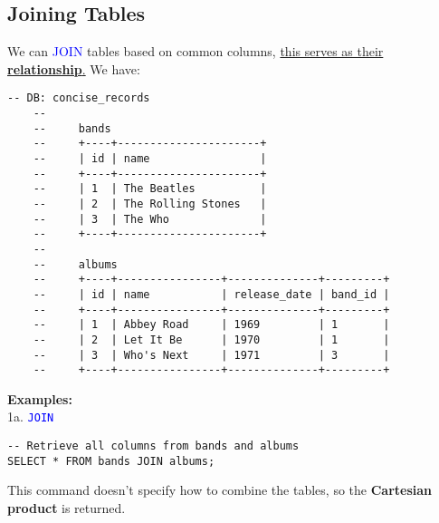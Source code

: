 \subsection{Joining Tables}
We can \textcolor{blue}{JOIN} tables based on common columns, \underline{this serves as their \textbf{relationship}.} We have:
\begin{lstlisting}[style=sql]
    -- DB: concise_records
    --
    --     bands
    --     +----+----------------------+
    --     | id | name                 |
    --     +----+----------------------+
    --     | 1  | The Beatles          |
    --     | 2  | The Rolling Stones   |
    --     | 3  | The Who              |
    --     +----+----------------------+
    --
    --     albums
    --     +----+----------------+--------------+---------+
    --     | id | name           | release_date | band_id |
    --     +----+----------------+--------------+---------+
    --     | 1  | Abbey Road     | 1969         | 1       |
    --     | 2  | Let It Be      | 1970         | 1       |
    --     | 3  | Who's Next     | 1971         | 3       |
    --     +----+----------------+--------------+---------+
\end{lstlisting}

\textbf{Examples:}\\
1a. \textcolor{blue}{\texttt{JOIN}}

\begin{lstlisting}[style=sql]
-- Retrieve all columns from bands and albums
SELECT * FROM bands JOIN albums;
\end{lstlisting}
This command doesn't specify how to combine the tables, so the \textbf{Cartesian product} is returned.\\

